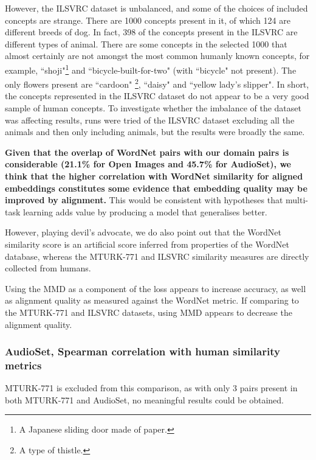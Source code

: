 However, the ILSVRC dataset is unbalanced, and some of the choices of included concepts are strange. There are 1000 concepts present in it, of which 124 are different breeds of dog. In fact, 398 of the concepts present in the ILSVRC are different types of animal. There are some concepts in the selected 1000 that almost certainly are not amongst the most common humanly known concepts, for example, ``shoji"\footnote{A Japanese sliding door made of paper.} and ``bicycle-built-for-two" (with ``bicycle" not present). The only flowers present are ``cardoon" \footnote{A type of thistle.}, ``daisy" and ``yellow lady's slipper". In short, the concepts represented in the ILSVRC dataset do not appear to be a very good sample of human concepts. To investigate whether the imbalance of the dataset was affecting results, runs were tried of the ILSVRC dataset excluding all the animals and then only including animals, but the results were broadly the same. 

\textbf{Given that the overlap of WordNet pairs with our domain pairs is considerable (21.1\% for Open Images and 45.7\% for AudioSet), we think that the higher correlation with WordNet similarity for aligned embeddings constitutes some evidence that embedding quality may be improved by alignment.} This would be consistent with hypotheses that multi-task learning adds value by producing a model that generalises better.

However, playing devil's advocate, we do also point out that the WordNet similarity score is an artificial score inferred from properties of the WordNet database, whereas the MTURK-771 and  ILSVRC similarity measures are directly collected from humans. 

Using the MMD as a component of the loss appears to increase accuracy, as well as alignment quality as measured against the WordNet metric. If comparing to the MTURK-771 and ILSVRC datasets, using MMD appears to decrease the alignment quality.  

\subsubsection{AudioSet, Spearman correlation with human similarity metrics}

MTURK-771 is excluded from this comparison, as with only 3 pairs present in both MTURK-771 and AudioSet, no meaningful results could be obtained. 

